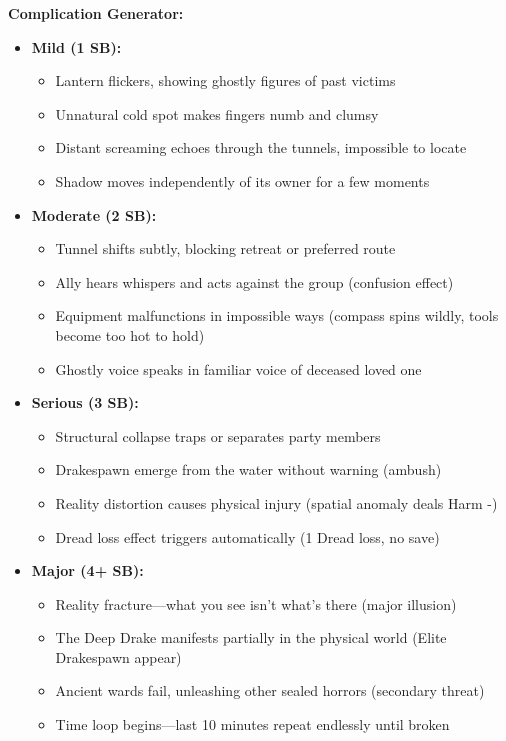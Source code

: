 \documentclass[11pt]{article}
\begin{document}
\textbf{Complication Generator:}
\begin{itemize}
\item \textbf{Mild (1 SB):} 
  \begin{itemize}
  \item Lantern flickers, showing ghostly figures of past victims
  \item Unnatural cold spot makes fingers numb and clumsy
  \item Distant screaming echoes through the tunnels, impossible to locate
  \item Shadow moves independently of its owner for a few moments
  \end{itemize}
\item \textbf{Moderate (2 SB):}
  \begin{itemize}
  \item Tunnel shifts subtly, blocking retreat or preferred route
  \item Ally hears whispers and acts against the group (confusion effect)
  \item Equipment malfunctions in impossible ways (compass spins wildly, tools become too hot to hold)
  \item Ghostly voice speaks in familiar voice of deceased loved one
  \end{itemize}
\item \textbf{Serious (3 SB):}
  \begin{itemize}
  \item Structural collapse traps or separates party members
  \item Drakespawn emerge from the water without warning (ambush)
  \item Reality distortion causes physical injury (spatial anomaly deals Harm -)
  \item Dread loss effect triggers automatically (1 Dread loss, no save)
  \end{itemize}
\item \textbf{Major (4+ SB):}
  \begin{itemize}
  \item Reality fracture---what you see isn't what's there (major illusion)
  \item The Deep Drake manifests partially in the physical world (Elite Drakespawn appear)
  \item Ancient wards fail, unleashing other sealed horrors (secondary threat)
  \item Time loop begins---last 10 minutes repeat endlessly until broken
  \end{itemize}
\end{itemize}
\end{document}
